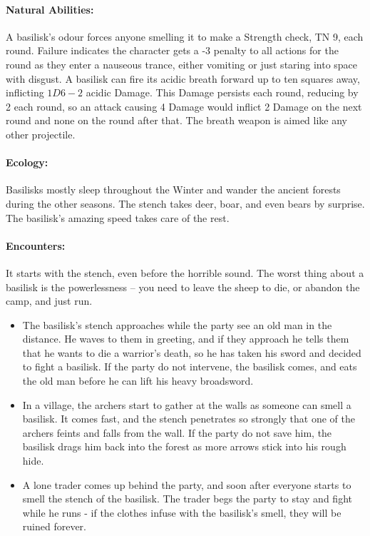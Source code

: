 \begin{multicols}{2}
\paragraph{Natural Abilities:} A basilisk's odour forces anyone smelling it to make a Strength check, TN 9, each round.
Failure indicates the character gets a -3 penalty to all actions for the round as they enter a nauseous trance, either vomiting or just staring into space with disgust.
A basilisk can fire its acidic breath forward up to ten squares away, inflicting $1D6-2$ acidic Damage.
This Damage persists each round, reducing by 2  each round, so an attack causing 4 Damage would inflict 2  Damage on the next round and none on the round after that.
The breath weapon is aimed like any other projectile.

\paragraph{Ecology:} Basilisks mostly sleep throughout the Winter and wander the ancient forests during the other seasons.
The stench takes deer, boar, and even bears by surprise.
The basilisk's amazing speed takes care of the rest.

\paragraph{Encounters:} It starts with the stench, even before the horrible sound.
The worst thing about a basilisk is the powerlessness -- you need to leave the sheep to die, or abandon the camp, and just run.

\begin{itemize}

  \item{The basilisk's stench approaches while the party see an old man in the distance.
  He waves to them in greeting, and if they approach he tells them that he wants to die a warrior's death, so he has taken his sword and decided to fight a basilisk.
  If the party do not intervene, the basilisk comes, and eats the old man before he can lift his heavy broadsword.}
  \item
  In a village, the archers start to gather at the walls as someone can smell a basilisk.
  It comes fast, and the stench penetrates so strongly that one of the archers feints and falls from the wall.
  If the party do not save him, the basilisk drags him back into the forest as more arrows stick into his rough hide.
  \item
  A lone trader comes up behind the party, and soon after everyone starts to smell the stench of the basilisk.
  The trader begs the party to stay and fight while he runs - if the clothes infuse with the basilisk's smell, they will be ruined forever.
  


\end{itemize}
\end{multicols}
